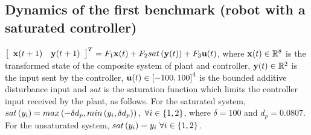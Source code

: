 \subsection*{Dynamics of the first benchmark (robot with a saturated controller)}
 $
\left[\begin{array}{cc}{\bf x}(t+1) &
    {\bf y}(t+1)\end{array}\right]^T=F_1{\bf x}(t)+F_2sat\left({\bf y}(t)\right)+F_3{\bf u}(t)$,
where ${\bf x}(t)\in\mathbb{R}^8$ is the
transformed state of the composite system of plant and controller, ${\bf y}(t)\in\mathbb{R}^2$
is the input sent by the controller, ${\bf u}(t)\in\left[-100,100\right]^4$
is the bounded additive disturbance input and $sat$ is the saturation
function which limits the controller input received by the plant, as
follows.  For the saturated system, $sat\left(y_i\right) = max\left(-\delta
d_p,min\left(y_i,\delta d_p\right)\right),~\forall i\in\{1,2\}$, where $\delta=100$
and $d_p=0.0807$.  For the unsaturated system,
$sat\left(y_i\right)=y_i~\forall i\in\{1,2\}$.
